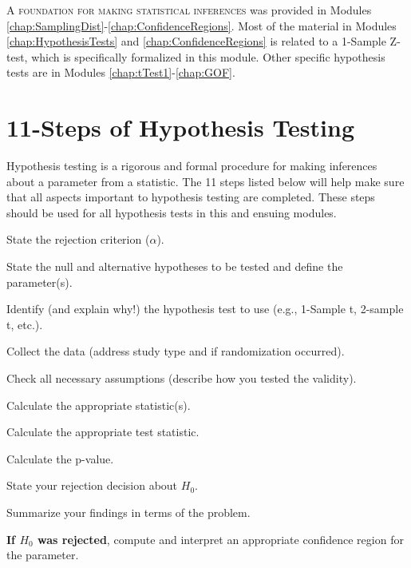 \documentclass[10pt,openany]{book}\usepackage[]{graphicx}\usepackage[]{color}
\begin{document}
\minitoc
\vspace{36pt}

\lettrine{A}{ foundation for making statistical inferences} was provided in Modules \ref{chap:SamplingDist}-\ref{chap:ConfidenceRegions}. Most of the material in Modules \ref{chap:HypothesisTests} and \ref{chap:ConfidenceRegions} is related to a 1-Sample Z-test, which is specifically formalized in this module. Other specific hypothesis tests are in Modules \ref{chap:tTest1}-\ref{chap:GOF}.

\newpage
\section{11-Steps of Hypothesis Testing}  \label{sec:11Steps}
\vspace{-12pt}
Hypothesis testing is a rigorous and formal procedure for making inferences about a parameter from a statistic. The 11 steps listed below will help make sure that all aspects important to hypothesis testing are completed.  These steps should be used for all hypothesis tests in this and ensuing modules.
\vspace{-12pt}
\begin{Enumerate}
  \item State the rejection criterion ($\alpha$).
  \item State the null and alternative hypotheses to be tested and define the parameter(s).
  \item Identify (and explain why!) the hypothesis test to use (e.g., 1-Sample t, 2-sample t, etc.).
  \item Collect the data (address study type and if randomization occurred).
  \item Check all necessary assumptions (describe how you tested the validity).
  \item Calculate the appropriate statistic(s).
  \item Calculate the appropriate test statistic.
  \item Calculate the p-value.
  \item State your rejection decision about $H_{0}$.
  \item Summarize your findings in terms of the problem.
  \item \textbf{If $H_{0}$ was rejected}, compute and interpret an appropriate confidence region for the parameter.
\end{Enumerate}
\vspace{-12pt}
\end{document}
